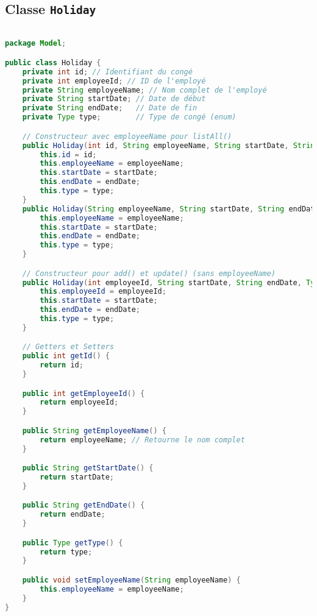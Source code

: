 \documentclass[a4paper,12pt]{article}
\begin{document}
\subsection{Classe \texttt{Holiday}}
\begin{lstlisting}[language=Java,caption={Classe Holiday}]

package Model;

public class Holiday {
    private int id; // Identifiant du congé
    private int employeeId; // ID de l'employé
    private String employeeName; // Nom complet de l'employé
    private String startDate; // Date de début
    private String endDate;   // Date de fin
    private Type type;        // Type de congé (enum)

    // Constructeur avec employeeName pour listAll()
    public Holiday(int id, String employeeName, String startDate, String endDate, Type type) {
        this.id = id;
        this.employeeName = employeeName;
        this.startDate = startDate;
        this.endDate = endDate;
        this.type = type;
    }
    public Holiday(String employeeName, String startDate, String endDate, Type type) {
        this.employeeName = employeeName;
        this.startDate = startDate;
        this.endDate = endDate;
        this.type = type;
    }

    // Constructeur pour add() et update() (sans employeeName)
    public Holiday(int employeeId, String startDate, String endDate, Type type) {
        this.employeeId = employeeId;
        this.startDate = startDate;
        this.endDate = endDate;
        this.type = type;
    }

    // Getters et Setters
    public int getId() {
        return id;
    }

    public int getEmployeeId() {
        return employeeId;
    }

    public String getEmployeeName() {
        return employeeName; // Retourne le nom complet
    }

    public String getStartDate() {
        return startDate;
    }

    public String getEndDate() {
        return endDate;
    }

    public Type getType() {
        return type;
    }

    public void setEmployeeName(String employeeName) {
        this.employeeName = employeeName;
    }
}
\end{lstlisting}
\end{document}
